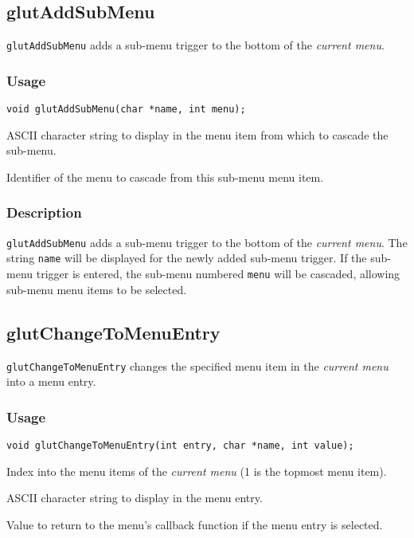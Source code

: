 \subsection{glutAddSubMenu}

{\tt glutAddSubMenu} adds a sub-menu trigger to the bottom of the {\em current menu}.

\subsubsection*{Usage}
\begin{verbatim}
void glutAddSubMenu(char *name, int menu);
\end{verbatim}
\begin{description}
\itemsep 0in
\item[\tt name]
ASCII character string to display in the menu item from which to cascade the sub-menu.
\item[\tt menu]
Identifier of the menu to cascade from this sub-menu menu item.
\end{description}

\subsubsection*{Description}

{\tt glutAddSubMenu} adds a sub-menu trigger to the bottom of the {\em current menu}.
The string {\tt name} will be displayed for the newly added sub-menu trigger.
If the sub-menu trigger is entered, the sub-menu numbered {\tt menu} will
be cascaded, allowing sub-menu menu items to be selected.

\subsection{glutChangeToMenuEntry}

{\tt glutChangeToMenuEntry} changes the specified menu item in the {\em current
menu} into a menu entry.

\subsubsection*{Usage}
\begin{verbatim}
void glutChangeToMenuEntry(int entry, char *name, int value);
\end{verbatim}
\begin{description}
\itemsep 0in
\item[\tt entry]
Index into the menu items of the {\em current menu} (1 is the topmost
menu item).
\item[\tt name]
ASCII character string to display in the menu entry.
\item[\tt value]
Value to return to the menu's callback function if the menu entry is selected.
\end{description}

